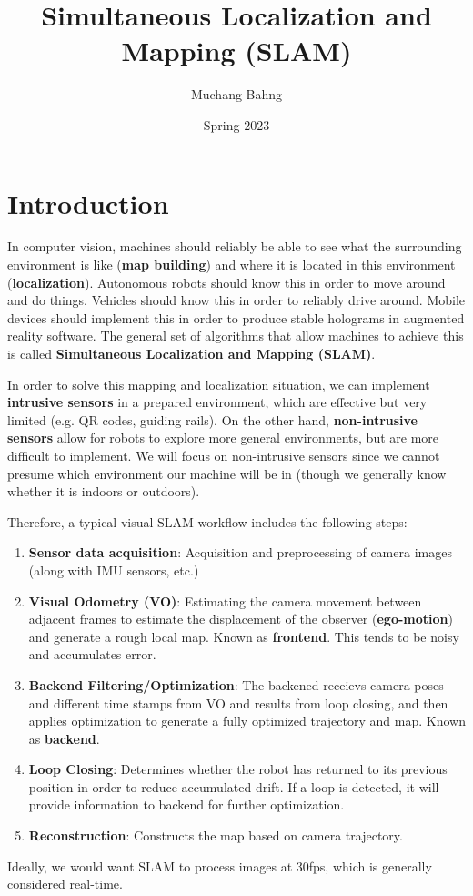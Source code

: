 \documentclass{article}
\newcounter{algo}[section]
\newcounter{code}[section]
\begin{document}
\title{Simultaneous Localization and Mapping (SLAM)}
\author{Muchang Bahng}
\date{Spring 2023}

\maketitle
\tableofcontents
\pagebreak

\section{Introduction}

  In computer vision, machines should reliably be able to see what the surrounding environment is like (\textbf{map building}) and where it is located in this environment (\textbf{localization}). Autonomous robots should know this in order to move around and do things. Vehicles should know this in order to reliably drive around. Mobile devices should implement this in order to produce stable holograms in augmented reality software. The general set of algorithms that allow machines to achieve this is called \textbf{Simultaneous Localization and Mapping (SLAM)}. 

  In order to solve this mapping and localization situation, we can implement \textbf{intrusive sensors} in a prepared environment, which are effective but very limited (e.g. QR codes, guiding rails). On the other hand, \textbf{non-intrusive sensors} allow for robots to explore more general environments, but are more difficult to implement. We will focus on non-intrusive sensors since we cannot presume which environment our machine will be in (though we generally know whether it is indoors or outdoors). 

  Therefore, a typical visual SLAM workflow includes the following steps: 
  \begin{enumerate}
      \item \textbf{Sensor data acquisition}: Acquisition and preprocessing of camera images (along with IMU sensors, etc.) 
      \item \textbf{Visual Odometry (VO)}: Estimating the camera movement between adjacent frames to estimate the displacement of the observer (\textbf{ego-motion}) and generate a rough local map. Known as \textbf{frontend}. This tends to be noisy and accumulates error. 
      \item \textbf{Backend Filtering/Optimization}: The backened receievs camera poses and different time stamps from VO and results from loop closing, and then applies optimization to generate a fully optimized trajectory and map. Known as \textbf{backend}. 
      \item \textbf{Loop Closing}: Determines whether the robot has returned to its previous position in order to reduce accumulated drift. If a loop is detected, it will provide information to backend for further optimization. 
      \item \textbf{Reconstruction}: Constructs the map based on camera trajectory. 
  \end{enumerate}
  Ideally, we would want SLAM to process images at 30fps, which is generally considered real-time. 
\end{document}
